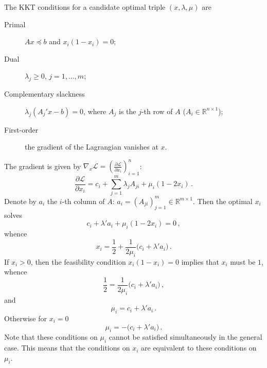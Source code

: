 \documentclass[a4paper]{article}
\newcommand{\Real}{\mathbb{R}}
\newcommand{\Lcal}{\mathcal{L}}
\begin{document}
The KKT conditions for a candidate optimal triple $(x,\lambda,\mu)$ are
\begin{description}
	\item[Primal] $Ax \preceq b$ and $x_i(1-x_i) = 0$;
	\item[Dual] $\lambda_j\geq 0$, $j=1,\ldots, m$;
	\item[Complementary slackness] $\lambda_j (A_j' x - b)=0$, where $A_j$ is the $j$-th 
	row of $A$ ($A_i\in \Real^{n\times 1}$);
	\item[First-order] the gradient of the Lagrangian vanishes at $x$.
\end{description}
The gradient is given by $\nabla_x \Lcal = ( \tfrac{\partial\Lcal}{\partial x_i} )_{i=1}^n$:
\[
\frac{\partial\Lcal}{\partial x_i}
	= c_i + \sum_{j=1}^m \lambda_j A_{ji} + \mu_i ( 1 - 2 x_i ) \,.
\]
Denote by $a_i$ the $i$-th column of $A$: $a_i = (A_{ji})_{j=1}^m \in \Real^{m\times 1}$. 
Then the optimal $x_i$ solves
\[ c_i + \lambda' a_i + \mu_i ( 1-2 x_i)  = 0 \,, \]
whence
\[ x_i = \frac{1}{2} + \frac{1}{2\mu_i}\bigl( c_i + \lambda' a_i \bigr) \,. \]
If $x_i>0$, then the feasibility condition $x_i(1-x_i) = 0$ implies that $x_i$ must
be $1$, whence
\[ \frac{1}{2} = \frac{1}{2\mu_i}\bigl( c_i + \lambda' a_i \bigr)\,, \]
and
\[ \mu_i = c_i + \lambda' a_i \,. \]
Otherwise for $x_i=0$
\[ \mu_i = -\bigl( c_i + \lambda' a_i\bigr) \,. \]
Note that these conditions on $\mu_i$ cannot be satisfied simultaneously in the general
case. This means that the conditions on $x_i$ are equivalent to these conditions
on $\mu_i$.
\end{document}
